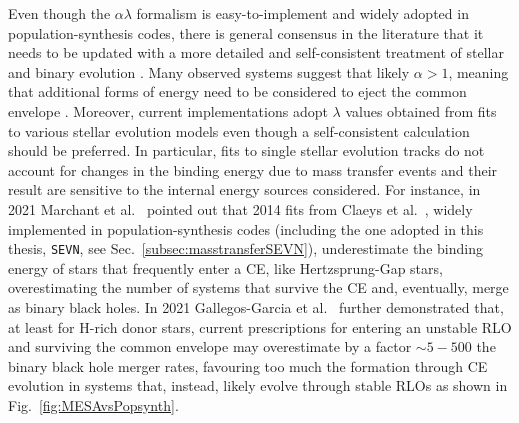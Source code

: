 \documentclass[a4paper,titlepage]{book}     	%
\begin{document}
Even though the $\alpha \lambda$ formalism is easy-to-implement and widely adopted in population-synthesis codes, there is general consensus in the literature that it needs to be updated with a more detailed and self-consistent treatment of stellar and binary evolution \cite{marchant2021_masstransferMESA}. Many observed systems suggest that likely $\alpha > 1$, meaning that additional forms of energy need to be considered to eject the common envelope \cite{mapelli}. Moreover, current implementations adopt $\lambda$ values obtained from fits to various stellar evolution models even though  a self-consistent calculation should be preferred. In particular, fits to single stellar evolution tracks do not account for changes in the binding energy due to mass transfer events and their result are sensitive to the internal energy sources considered. For instance, in 2021 Marchant et al.\ \cite{marchant2021_masstransferMESA} pointed out that 2014 fits from Claeys et al.\ \cite{Clayes2014_lambdaCE}, widely implemented in population-synthesis codes (including the one adopted in this thesis, \texttt{SEVN}, see Sec.\ \ref{subsec:masstransferSEVN}), underestimate the binding energy of stars that frequently enter a CE, like Hertzsprung-Gap stars, overestimating the number of systems that survive the CE and, eventually, merge as binary black holes. In 2021 Gallegos-Garcia et al.\ \cite{gallegos2021MESAvspopsynth} further demonstrated that, at least for H-rich donor stars, current prescriptions for entering an unstable RLO and surviving the common envelope may overestimate by a factor $\sim 5-500$ the binary black hole merger rates, favouring too much the formation through CE evolution in systems that, instead, likely evolve through stable RLOs as shown in Fig.\ \ref{fig:MESAvsPopsynth}.
\end{document}
